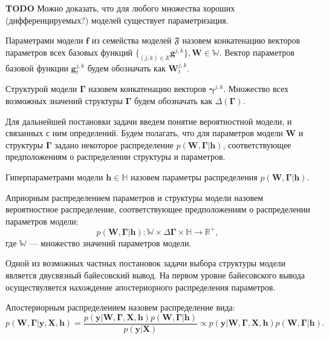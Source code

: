 \textbf{TODO} Можно доказать, что для любого множества хороших (дифференцируемых?) моделей существует параметризация.

\begin{defin}
Параметрами модели $\mathbf{f}$ из семейства моделей $\mathfrak{F}$  назовем конкатенацию векторов параметров всех базовых функций $\{_{(j,k) \in E} \mathbf{g}^{j,k}\}, \mathbf{W} \in \mathbb{W}.$ Вектор параметров базовой функции $\mathbf{g}^{j,k}_t$ будем обозначать как $\mathbf{W}^{j,k}_t$.
\end{defin}

\begin{defin}
Структурой модели $\boldsymbol{\Gamma}$ назовем конкатенацию векторов $\boldsymbol{\gamma}^{j,k}$. Множество всех возможных значений структуры $\boldsymbol{\Gamma}$ будем обозначать как $\Delta(\boldsymbol{\Gamma})$.
\end{defin}

Для дальнейшей постановки задачи введем понятие вероятностной модели, и связанных с ним определений. Будем полагать, что для параметров модели $\mathbf{W}$ и структуры  $\boldsymbol{\Gamma}$ задано некоторое распределение $p(\mathbf{W}, \boldsymbol{\Gamma}|\mathbf{h})$, соответствующее предположениям о распределении структуры и параметров. 

\begin{defin}
Гиперпараметрами модели $\mathbf{h}\in \mathbb{H}$ назовем параметры распределения $p(\mathbf{W}, \boldsymbol{\Gamma}|\mathbf{h})$.
\end{defin}

\begin{defin}
Априорным распределением параметров и структуры модели назовем вероятностное распределение, соответствующее предположениям о распределении параметров модели:
\[
    p(\mathbf{W}, \boldsymbol{\Gamma}|\mathbf{h}): \mathbb{W} \times \Delta{\boldsymbol{\Gamma}} \times \mathbb{H} \to \mathbb{R}^{+}, 
\]
где $\mathbb{W}$ --- множество значений параметров модели.
\end{defin}


Одной из возможных частных постановок задачи выбора структуры модели является двусвязный байесовский вывод. 
На первом уровне байесовского вывода осуществуляется нахождение апостериорного распределения параметров.

\begin{defin}
Апостериорным распределением назовем распределение вида:
\begin{equation}
\label{eq:posterior}
    p(\mathbf{W}, \boldsymbol{\Gamma}|\mathbf{y}, \mathbf{X}, \mathbf{h}) = \frac{p(\mathbf{y}|\mathbf{W}, \boldsymbol{\Gamma}, \mathbf{X}, \mathbf{h})p(\mathbf{W}, \boldsymbol{\Gamma}|\mathbf{h})}{p(\mathbf{y}|\mathbf{X})} \propto p(\mathbf{y}|\mathbf{W},  \boldsymbol{\Gamma}, \mathbf{X}, \mathbf{h}) p(\mathbf{W}, \boldsymbol{\Gamma}|\mathbf{h}).%
\end{equation}
\end{defin}

